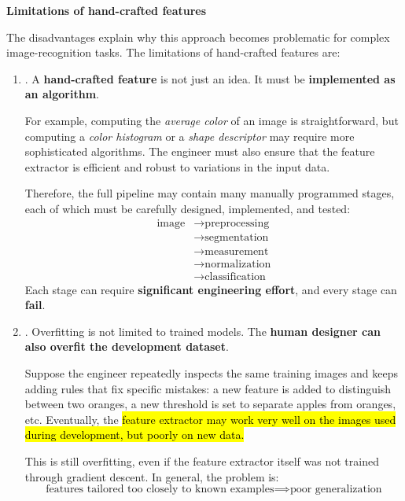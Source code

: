 \highspace
\begin{flushleft}
    \textcolor{Red2}{ \textbf{Limitations of hand-crafted features}}
\end{flushleft}
The disadvantages explain why this approach becomes problematic for complex image-recognition tasks. The limitations of hand-crafted features are:
\begin{enumerate}
    \item {}. A \textbf{hand-crafted feature} is not just an idea. It must be \textbf{implemented as an algorithm}.
    
    \highspace
    For example, computing the \emph{average color} of an image is straightforward, but computing a \emph{color histogram} or a \emph{shape descriptor} may require more sophisticated algorithms. The engineer must also ensure that the feature extractor is efficient and robust to variations in the input data.

    \highspace
    Therefore, the full pipeline may contain many manually programmed stages, each of which must be carefully designed, implemented, and tested:
    \begin{align*}
        \text{image} & \to \text{preprocessing} \\
        & \to \text{segmentation} \\
        & \to \text{measurement} \\
        & \to \text{normalization} \\
        & \to \text{classification}
    \end{align*}
    Each stage can require \textbf{significant engineering effort}, and every stage can \textbf{fail}.


    \item {}. Overfitting is not limited to trained models. The \textbf{human designer can also overfit the development dataset}.
    
    \highspace
    Suppose the engineer repeatedly inspects the same training images and keeps adding rules that fix specific mistakes: a new feature is added to distinguish between two oranges, a new threshold is set to separate apples from oranges, etc. Eventually, the \hl{feature extractor may work very well on the images used during development, but poorly on new data.}
    
    \highspace
    This is still overfitting, even if the feature extractor itself was not trained through gradient descent. In general, the problem is:
    \begin{equation*}
        \text{features tailored too closely to known examples} \implies \text{poor generalization}
    \end{equation*}



\end{enumerate}

